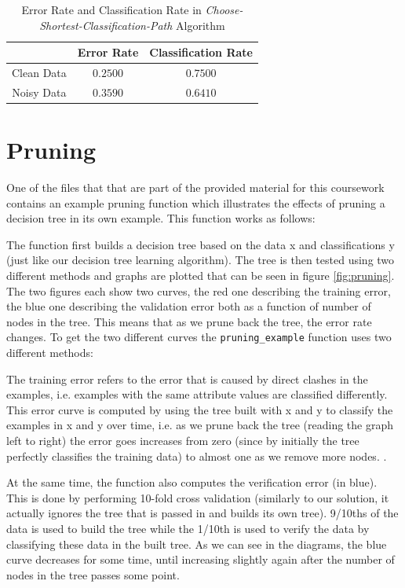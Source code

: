 \documentclass[10pt,a4paper]{article}
\begin{document}
\begin{table}[!ht]
\centering
\begin{tabular}{|c|c|c|}
\hline 
 & \textbf{Error Rate} & \textbf{Classification Rate} \\ 
\hline 
Clean Data & $0.2500$ & $0.7500$ \\ 
\hline 
Noisy Data & $0.3590$ & $0.6410$ \\ 
\hline 
\end{tabular} 
\caption{Error Rate and Classification Rate in \emph{Choose-Shortest-Classification-Path} Algorithm}
\label{tab:chooseDepthRates}
\end{table}

\section{Pruning}

One of the files that that are part of the provided material for this coursework contains an example pruning function which illustrates the effects of pruning a decision tree in its own example. This function works as follows:

The function first builds a decision tree based on the data x and classifications y (just like our decision tree learning algorithm). The tree is then tested using two different methods and graphs are plotted that can be seen in figure \ref{fig:pruning}. The two figures each show two curves, the red one describing the training error, the blue one describing the validation error both as a function of number of nodes in the tree. This means that as we prune back the tree, the error rate changes. To get the two different curves the \texttt{pruning\_example} function uses two different methods:

The training error refers to the error that is caused by direct clashes in the examples, i.e. examples with the same attribute values are classified differently. This error curve is computed by using the tree built with x and y to classify the examples in x and y over time, i.e. as we prune back the tree (reading the graph left to right) the error goes increases from zero (since by initially the tree perfectly classifies the training data) to almost one as we remove more nodes. .

At the same time, the function also computes the verification error (in blue). This is done by performing 10-fold cross validation (similarly to our solution, it actually ignores the tree that is passed in and builds its own tree). 9/10ths of the data is used to build the tree while the 1/10th is used to verify the data by classifying these data in the built tree. As we can see in the diagrams, the blue curve decreases for some time, until increasing slightly again after the number of nodes in the tree passes some point. 
\end{document}
